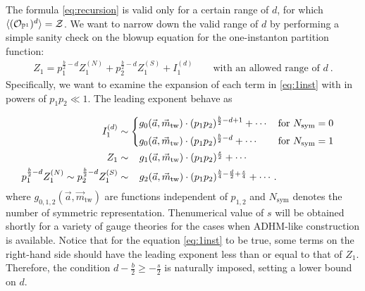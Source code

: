 \documentclass[letterpaper, 11pt]{article}
\newcommand{\nn}{\nonumber}
\def\IP{\mathbb{P}}
\def\CZ{{\cal Z}}
\begin{document}
The formula \eqref{eq:recursion} is valid only for a certain range of $d$, for which $\langle (\mathcal{O}_{\IP^1})^{d}\rangle = \CZ$. We want to narrow down the valid range of $d$ by performing a simple sanity check on the blowup equation for the one-instanton partition function:
\begin{align}
  \label{eq:1inst}
  Z_1 = p_1^{\frac{b}{2}-d}Z^{(N)}_1  + p_2^{\frac{b}{2}-d}  Z^{(S)}_1  + I_1^{(d)} \qquad \text{with an allowed range of $d$} \ .
\end{align}
Specifically, we want to examine the expansion of each term in \eqref{eq:1inst} with in powers of $p_1p_2 \ll 1$. The  leading exponent behave as {\allowdisplaybreaks
\begin{align}
\begin{split}
  I_1^{(d)} &\sim \begin{dcases}
    g_0(\vec{a},  \vec{m}_{\text{tw}})\cdot  (p_1p_2)^{\frac{b}{2}-d + 1} + \cdots   &  \text{for }N_\text{sym} = 0\\
    g_0(\vec{a},  \vec{m}_{\text{tw}})\cdot (p_1p_2)^{\frac{b}{2}-d } + \cdots    &  \text{for }N_\text{sym} = 1
\end{dcases}
   \\
  Z_1 &\sim   \ \ \, g_1(\vec{a},  \vec{m}_{\text{tw}})\cdot (p_1p_2)^{\frac{s}{2}}  + \cdots   \\
  p_1^{\frac{b}{2}-d}Z_1^{(N)}\sim p_2^{\frac{b}{2}-d}  Z^{(S)}_1 &\sim  \ \ \,  g_2(\vec{a},  \vec{m}_{\text{tw}})\cdot  (p_1p_2)^{\frac{b}{4}-\frac{d}{2}+\frac{s}{4}}   + \cdots   .
  \end{split}
\end{align}
where $g_{0, 1, 2}(\vec{a}, \vec{m}_{\text{tw}})$ are functions independent of $p_{1, 2}$ and $N_{\text{sym}}$ denotes the number of symmetric representation. Thenumerical value of $s$ will be obtained shortly for a variety of gauge theories for the cases when ADHM-like construction is available.
Notice that for the equation \eqref{eq:1inst} to be true, some terms on the right-hand side should have the leading exponent less than or equal to that of $Z_1$. Therefore, the condition $d - \frac{b}{2} \geq -\frac{s}{2}$ is naturally imposed, setting a lower bound on $d$. 

}
\end{document}
